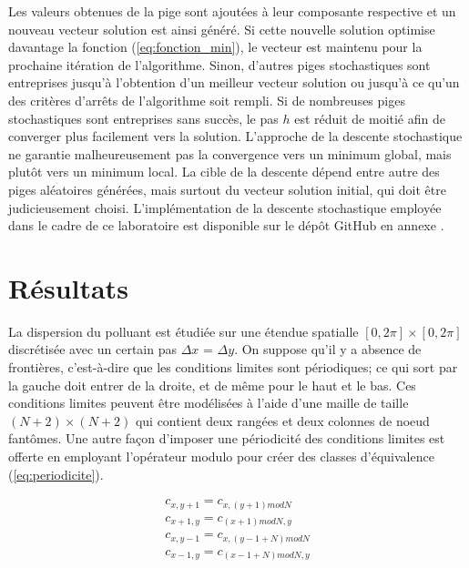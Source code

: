 \documentclass{article}
\begin{document}
Les valeurs obtenues de la pige sont ajoutées à leur composante respective et un nouveau vecteur solution est ainsi généré. Si cette nouvelle solution optimise davantage la fonction (\ref{eq:fonction_min}), le vecteur est maintenu pour la prochaine itération de l'algorithme. Sinon, d'autres piges stochastiques sont entreprises jusqu'à l'obtention d'un meilleur vecteur solution ou jusqu'à ce qu'un des critères d'arrêts de l'algorithme soit rempli. Si de nombreuses piges stochastiques sont entreprises sans succès, le pas $h$ est réduit de moitié afin de converger plus facilement vers la solution. L'approche de la descente stochastique ne garantie malheureusement pas la convergence vers un minimum global, mais plutôt vers un minimum local. La cible de la descente dépend entre autre des piges aléatoires générées, mais surtout du vecteur solution initial, qui doit être judicieusement choisi. L'implémentation de la descente stochastique employée dans le cadre de ce laboratoire est disponible sur le dépôt GitHub en annexe \cite{github}.

\section{Résultats}\label{resultats}

La dispersion du polluant est étudiée sur une étendue spatialle $[0, 2\pi] \times [0,2 \pi]$ discrétisée avec un certain pas $\Delta x$ = $\Delta y$. On suppose qu'il y a absence de frontières, c'est-à-dire que les conditions limites sont périodiques; ce qui sort par la gauche doit entrer de la droite, et de même pour le haut et le bas. Ces conditions limites peuvent être modélisées à l'aide d'une maille de taille $(N+2) \times (N+2)$ qui contient deux rangées et deux colonnes de noeud fantômes. Une autre façon d'imposer une périodicité des conditions limites est offerte en employant l'opérateur modulo pour créer des classes d'équivalence (\ref{eq:periodicite}).


\begin{equation} \label{eq:periodicite}
\begin{gathered}
	c_{x, y+1} = c_{x, (y+1)mod N}\\
	c_{x+1, y} = c_{(x+1)modN, y}\\
	c_{x, y-1} = c_{x, (y-1+N)mod N}\\
	c_{x-1, y} = c_{(x-1+N)modN, y}\\
\end{gathered}
\end{equation}
\end{document}

